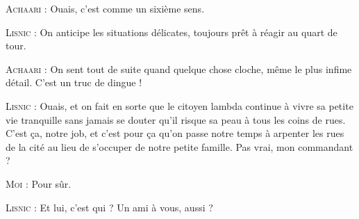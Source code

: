 \begin{dialogue}
\textsc{Achaari} : Ouais, c’est comme un sixième sens.

\textsc{Lisnic} : On anticipe les situations délicates, toujours prêt à réagir au quart de tour.

\textsc{Achaari} : On sent tout de suite quand quelque chose cloche, même le plus infime détail. C’est un truc de dingue !

\textsc{Lisnic} : Ouais, et on fait en sorte que le citoyen lambda continue à vivre sa petite vie tranquille sans jamais se douter qu’il risque sa peau à tous les coins de rues. C’est ça, notre job, et c’est pour ça qu’on passe notre temps à arpenter les rues de la cité au lieu de s’occuper de notre petite famille. Pas vrai, mon commandant ?

\textsc{Moi} : Pour sûr.

\textsc{Lisnic} : Et lui, c’est qui ? Un ami à vous, aussi ?

\end{dialogue}

